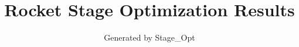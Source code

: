 \documentclass{article}
\begin{document}
\title{Rocket Stage Optimization Results}
\author{Generated by Stage\_Opt}
\end{document}
